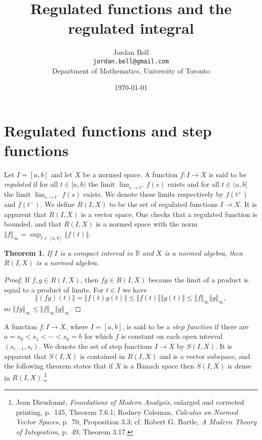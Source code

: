 \documentclass{article}
\newcommand{\norm}[1]{\left\Vert #1 \right\Vert}
\newtheorem{theorem}{Theorem}
\theoremstyle{definition}
\begin{document}
\title{Regulated functions and the regulated integral}
\author{Jordan Bell\\ \texttt{jordan.bell@gmail.com}\\Department of Mathematics, University of Toronto}
\date{\today}

\maketitle

\section{Regulated functions and step functions}
Let $I=[a,b]$ and let $X$ be a normed space. A function $f:I \to X$ is said to be {\em regulated} if for all
$t \in [a,b)$ the limit $\lim_{s \to t^+} f(s)$ exists and for all $t \in (a,b]$ the limit $\lim_{s \to t^-} f(s)$ exists. 
We denote these limits respectively by $f(t^+)$ and $f(t^-)$.
We define $R(I,X)$ to be the set of regulated functions $I \to X$. It is apparent that $R(I,X)$ is a vector space. One checks that a regulated function is bounded,
and that $R(I,X)$ is a normed space with the norm
$\norm{f}_\infty=\sup_{t \in [a,b]} \norm{f(t)}$.

\begin{theorem}
If $I$ is a compact interval in $\mathbb{R}$ and $X$ is a normed algebra, then $R(I,X)$ is a normed algebra.
\end{theorem}
\begin{proof}
If $f,g \in R(I,X)$, then $fg \in R(I,X)$ because the limit of a product is equal to a product of limits. 
For $t \in I$ we have
\[
\norm{(fg)(t)} = \norm{f(t)g(t)} \leq \norm{f(t)}  \norm{g(t)} \leq \norm{f}_\infty \norm{g}_\infty,
\]
so $\norm{fg}_\infty \leq \norm{f}_\infty \norm{g}_\infty$. 
\end{proof}

A function $f:I \to X$, where $I=[a,b]$, is said to be a {\em step function} if there are $a=s_0<s_1<\cdots<s_k=b$ for which
$f$ is constant on each open interval $(s_{i-1},s_i)$.  
We denote the set of step functions $I \to X$ by $S(I,X)$. 
It is apparent that $S(I,X)$ is contained in $R(I,X)$ and is a vector subspace, and the following theorem states that if $X$ is a Banach space then $S(I,X)$ is dense in $R(I,X)$.\footnote{Jean Dieudonn\'e, {\em Foundations of Modern Analysis}, enlarged and corrected printing, p.~145, Theorem 7.6.1;
Rodney Coleman, {\em Calculus on Normed Vector Spaces}, p.~70, Proposition 3.3; 
cf. Robert G. Bartle, {\em A Modern Theory of
Integration}, p.~49, Theorem 3.17.}
\end{document}
